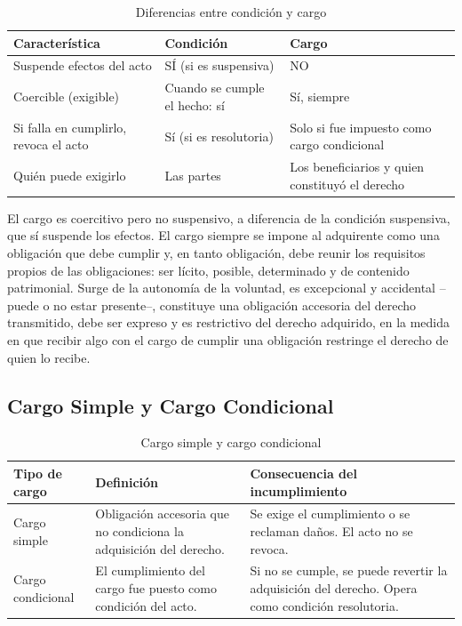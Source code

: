\documentclass[12pt,oneside]{book}
\begin{document}
\begin{table}[H]
\centering
\begin{tabularx}{\textwidth}{X X X}
\toprule
\textbf{Característica} & \textbf{Condición} & \textbf{Cargo} \\
\midrule
Suspende efectos del acto & SÍ (si es suspensiva) & NO \\
Coercible (exigible) & Cuando se cumple el hecho: sí & Sí, siempre \\
Si falla en cumplirlo, revoca el acto & Sí (si es resolutoria) & Solo si fue impuesto como cargo condicional \\
Quién puede exigirlo & Las partes & Los beneficiarios y quien constituyó el derecho \\
\bottomrule
\end{tabularx}
\caption{Diferencias entre condición y cargo}
\end{table}

El cargo es coercitivo pero no suspensivo, a diferencia de la condición suspensiva, que sí suspende los efectos. El cargo siempre se impone al adquirente como una obligación que debe cumplir y, en tanto obligación, debe reunir los requisitos propios de las obligaciones: ser lícito, posible, determinado y de contenido patrimonial. Surge de la autonomía de la voluntad, es excepcional y accidental --puede o no estar presente--, constituye una obligación accesoria del derecho transmitido, debe ser expreso y es restrictivo del derecho adquirido, en la medida en que recibir algo con el cargo de cumplir una obligación restringe el derecho de quien lo recibe.

\subsection{Cargo Simple y Cargo Condicional}

\begin{table}[H]
\centering
\begin{tabularx}{\textwidth}{l X X}
\toprule
\textbf{Tipo de cargo} & \textbf{Definición} & \textbf{Consecuencia del incumplimiento} \\
\midrule
Cargo simple & Obligación accesoria que no condiciona la adquisición del derecho. & Se exige el cumplimiento o se reclaman daños. El acto no se revoca. \\
Cargo condicional & El cumplimiento del cargo fue puesto como condición del acto. & Si no se cumple, se puede revertir la adquisición del derecho. Opera como condición resolutoria. \\
\bottomrule
\end{tabularx}
\caption{Cargo simple y cargo condicional}
\end{table}
\end{document}
